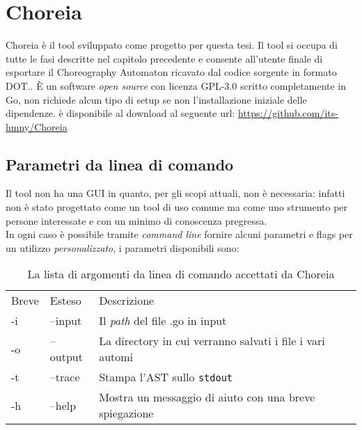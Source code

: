 \chapter{Choreia}
Choreia è il tool sviluppato come progetto per questa tesi. Il tool si occupa di tutte le fasi descritte nel capitolo precedente e consente all'utente finale di esportare il Choreography Automaton ricavato dal codice sorgente in formato DOT.. È un software \emph{open source} con licenza GPL-3.0 scritto completamente in Go, non richiede alcun tipo di setup se non l'installazione iniziale delle dipendenze. è disponibile al download al seguente url: \url{https://github.com/its-hmny/Choreia}\\

\section{Parametri da linea di comando}
Il tool non ha una GUI in quanto, per gli scopi attuali, non è necessaria: infatti non è stato progettato come un tool di uso comune ma come uno strumento per persone interessate e con un minimo di conoscenza pregressa.\\
In ogni caso è possibile tramite \emph{command line} fornire alcuni parametri e flags per un utilizzo \emph{personalizzato}, i parametri disponibili sono:
\begin{table}[h!]
    \centering
    \begin{tabular}{l l l}
        Breve & Esteso   & Descrizione                                               \\
        -i    & --input  & Il \emph{path} del file .go in input                      \\
        -o    & --output & La directory in cui verranno salvati i file i vari automi \\
        -t    & --trace  & Stampa l'AST sullo \texttt{stdout}                        \\
        -h    & --help   & Mostra un messaggio di aiuto con una breve spiegazione    \\
    \end{tabular}
    \caption{La lista di argomenti da linea di comando  accettati da Choreia}
\end{table}

